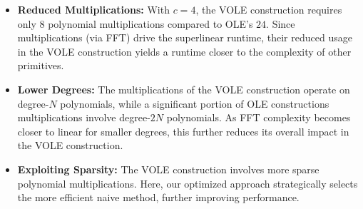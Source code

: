 \begin{itemize}
    \item \textbf{Reduced Multiplications:} With $c=4$, the VOLE construction requires only $8$ polynomial multiplications compared to OLE's $24$. Since multiplications (via FFT) drive the superlinear runtime, their reduced usage in the VOLE construction yields a runtime closer to the complexity of other primitives.
    
    \item \textbf{Lower Degrees:} The multiplications of the VOLE construction operate on degree-$N$ polynomials, while a significant portion of OLE constructions multiplications involve degree-$2N$ polynomials. As FFT complexity becomes closer to linear for smaller degrees, this further reduces its overall impact in the VOLE construction.
    
    \item \textbf{Exploiting Sparsity:} The VOLE construction involves more sparse polynomial multiplications. Here, our optimized approach strategically selects the more efficient naive method, further improving performance.
\end{itemize}


